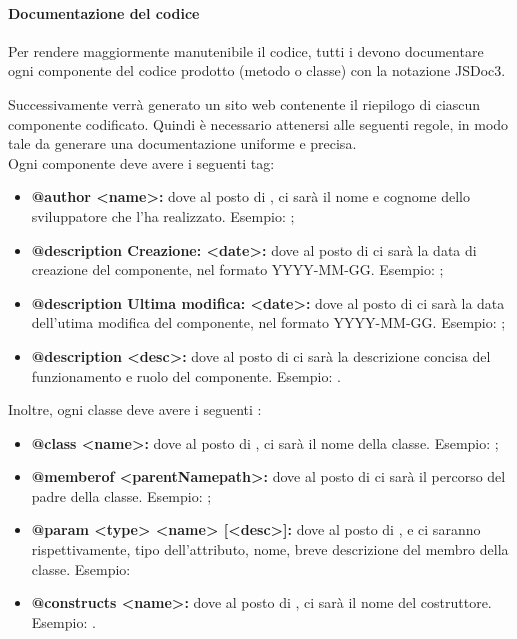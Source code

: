            		\paragraph{Documentazione del codice}
           		Per rendere maggiormente manutenibile il codice, tutti i \programmatori{} devono documentare ogni componente del codice prodotto (metodo o classe) con la notazione JSDoc3.
           		
           		Successivamente verrà generato un sito web contenente il riepilogo di ciascun componente codificato. Quindi è necessario attenersi alle seguenti regole, in modo tale da generare una documentazione uniforme e precisa. \\
           		Ogni componente deve avere i seguenti tag:
           		\begin{itemize}
           			\item \textbf{@author <name>:} dove al posto di , ci sarà il nome e cognome dello sviluppatore che l'ha realizzato. Esempio: ;
           			\item \textbf{@description Creazione: <date>:} dove al posto di  ci sarà la data di creazione del componente, nel formato YYYY-MM-GG. Esempio: ;
           			\item \textbf{@description Ultima modifica: <date>:} dove al posto di  ci sarà la data dell'utima modifica del componente, nel formato YYYY-MM-GG. Esempio: ;
           			\item \textbf{@description <desc>:} dove al posto di  ci sarà la descrizione concisa del funzionamento e ruolo del componente. Esempio: .
           		\end{itemize} 
           		Inoltre, ogni classe deve avere i seguenti :
           		\begin{itemize}
           			\item \textbf{@class <name>:} dove al posto di , ci sarà il nome della classe. Esempio: ;
           			\item \textbf{@memberof <parentNamepath>:} dove al posto di  ci sarà il percorso del padre della classe. Esempio: ;
           			\item \textbf{@param <{type}> <name> [<desc>]:} dove al posto di ,  e  ci saranno rispettivamente, tipo dell'attributo, nome, breve descrizione del membro della classe. Esempio: 
           			\item \textbf{@constructs <name>:} dove al posto di , ci sarà il nome del costruttore. Esempio: .
           		\end{itemize}
